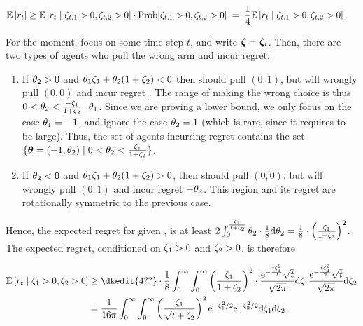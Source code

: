 \begin{align*}
\Expect{\Regret{t}} 
  & \geq \ExpectC{\Regret{t}}{\Noise[t]{1} > 0, \Noise[t]{2} > 0}
         \cdot \Prob{\Noise[t]{1} > 0, \Noise[t]{2} > 0}
  \; = \; \quarter \ExpectC{\Regret{t}}{\Noise[t]{1} > 0, \Noise[t]{2} > 0}.
\end{align*}

For the moment, focus on some time step $t$,
and write $\NoiseV = \NoiseV[t]$.
Then, there are two types of agents who pull the wrong arm and incur
regret:
\begin{enumerate}
\item If $\Ag{2} > 0$ and $\Ag{1} \Noise{1} + \Ag{2} (1+\Noise{2}) < 0$
then \AgV should pull $(0,1)$,
but will wrongly pull $(0,0)$ and incur regret .
The range of \AgV making the wrong choice is thus
$0 < \Ag{2} < \frac{- \Noise{1}}{1+\Noise{2}} \cdot \Ag{1}$.
Since we are proving a lower bound, we only focus on the
case $\Ag{1} = -1$, and ignore the case $\Ag{2} = 1$
(which is rare, since it requires  to be large).
Thus, the set of agents incurring regret contains the set
$\Set{\AgV = (-1, \Ag{2})}{0 < \Ag{2} < \frac{\Noise{1}}{1+\Noise{2}}}$.


\item If $\Ag{2} < 0$ and $\Ag{1} \Noise{1} + \Ag{2} (1+\Noise{2}) > 0$,
then \AgV should pull $(0,0)$,
but will wrongly pull $(0,1)$ and incur regret $-\Ag{2}$.
This region and its regret are rotationally symmetric to the previous
case.
\end{enumerate}

Hence, the expected regret for given ,  is at least
$2 \int_0^{\frac{\Noise{1}}{1+\Noise{2}}}
  \Ag{2} \cdot \frac{1}{8} \dd \Ag{2}
=
\frac{1}{8} \cdot \left(\frac{\Noise{1}}{1+\Noise{2}}\right)^2$.
The expected regret, conditioned on
$\Noise{1} > 0$ and $\Noise{2} > 0$, is therefore

\begin{align*}
\ExpectC{\Regret{t}}{\Noise{1} > 0, \Noise{2} > 0}
 & \geq \dkedit{4??} \cdot \frac{1}{8}
    \int_{0}^{\infty} \int_{0}^{\infty}
    \left( \frac{\Noise{1}}{1+\Noise{2}} \right)^2 \cdot
    \frac{\e^{-\frac{t \Noise{1}^2}{2}} \sqrt{t}}{\sqrt{2\pi}} \dd\Noise{1}
    \frac{\e^{-\frac{t \Noise{2}^2}{2}} \sqrt{t}}{\sqrt{2\pi}} \dd\Noise{2} \\
 & = \frac{1}{16\pi} \int_{0}^{\infty} \int_{0}^{\infty}
   \left( \frac{\Noise{1}}{\sqrt{t}+\Noise{2}} \right)^2
   \e^{-\Noise{1}^2/2} \e^{-\Noise{2}^2/2} \dd \Noise{1} \dd \Noise{2}.
\end{align*}

